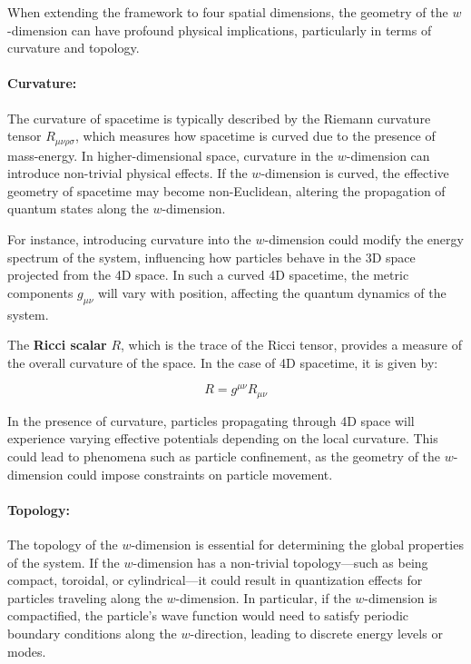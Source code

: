 \documentclass[12pt]{article}
\begin{document}
When extending the framework to four spatial dimensions, the geometry of the \( w \)-dimension can have profound physical implications, particularly in terms of curvature and topology.

\paragraph{Curvature:} The curvature of spacetime is typically described by the Riemann curvature tensor \( R_{\mu \nu \rho \sigma} \), which measures how spacetime is curved due to the presence of mass-energy. In higher-dimensional space, curvature in the \( w \)-dimension can introduce non-trivial physical effects. If the \( w \)-dimension is curved, the effective geometry of spacetime may become non-Euclidean, altering the propagation of quantum states along the \( w \)-dimension.

For instance, introducing curvature into the \( w \)-dimension could modify the energy spectrum of the system, influencing how particles behave in the 3D space projected from the 4D space. In such a curved 4D spacetime, the metric components \( g_{\mu \nu} \) will vary with position, affecting the quantum dynamics of the system.

The \textbf{Ricci scalar} \( R \), which is the trace of the Ricci tensor, provides a measure of the overall curvature of the space. In the case of 4D spacetime, it is given by:


\begin{equation}
R = g^{\mu \nu} R_{\mu \nu}
\end{equation}

In the presence of curvature, particles propagating through 4D space will experience varying effective potentials depending on the local curvature. This could lead to phenomena such as particle confinement, as the geometry of the \( w \)-dimension could impose constraints on particle movement.

\paragraph{Topology:} The topology of the \( w \)-dimension is essential for determining the global properties of the system. If the \( w \)-dimension has a non-trivial topology—such as being compact, toroidal, or cylindrical—it could result in quantization effects for particles traveling along the \( w \)-dimension. In particular, if the \( w \)-dimension is compactified, the particle's wave function would need to satisfy periodic boundary conditions along the \( w \)-direction, leading to discrete energy levels or modes.
\end{document}
